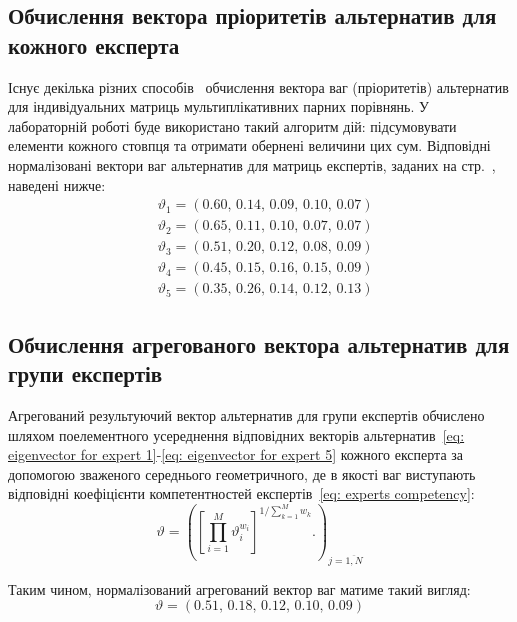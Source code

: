 \documentclass{mathreport}
\begin{document}
\subsection{Обчислення вектора пріоритетів альтернатив для кожного експерта}

Існує декілька різних способів~\cite{Saaty1990} обчислення вектора ваг (пріоритетів) альтернатив для індивідуальних матриць мультиплікативних парних порівнянь. У лабораторній роботі буде використано такий алгоритм дій: підсумовувати елементи кожного стовпця та отримати обернені величини цих сум. Відповідні нормалізовані вектори ваг альтернатив для матриць експертів, заданих на стр.~\pageref{table: 1-2 experts matrices}, наведені нижче:
\begin{align}
    & \vartheta_1 = (0.60,\, 0.14,\, 0.09,\, 0.10,\, 0.07) \label{eq: eigenvector for expert 1} \\
    & \vartheta_2 = (0.65,\, 0.11,\, 0.10,\, 0.07,\, 0.07) \label{eq: eigenvector for expert 2} \\
    & \vartheta_3 = (0.51,\, 0.20,\, 0.12,\, 0.08,\, 0.09) \label{eq: eigenvector for expert 3} \\
    & \vartheta_4 = (0.45,\, 0.15,\, 0.16,\, 0.15,\, 0.09) \label{eq: eigenvector for expert 4} \\
    & \vartheta_5 = (0.35,\, 0.26,\, 0.14,\, 0.12,\, 0.13) \label{eq: eigenvector for expert 5}
\end{align} 

\subsection{Обчислення агрегованого вектора альтернатив для групи експертів}
\label{section: merged eigenvector}

Агрегований результуючий вектор альтернатив для групи експертів обчислено шляхом поелементного усереднення відповідних векторів альтернатив~\eqref{eq: eigenvector for expert 1}-\eqref{eq: eigenvector for expert 5} кожного експерта за допомогою зваженого середнього геометричного, де в якості ваг виступають відповідні коефіцієнти компетентностей експертів~\eqref{eq: experts competency}:
\begin{equation}\label{eq: gmean}
    \vartheta = \left( \left[ \prod\limits_{i=1}^{M} \vartheta_{i}^{w_i} \right]^{1 \bigl/ \sum\limits_{k=1}^{M} w_k} \bigr. \right)_{j=\overline{1,N}}
\end{equation}

Таким чином, нормалізований агрегований вектор ваг матиме такий вигляд:
\begin{equation}\label{eq: gmean value}
    \vartheta = (0.51,\, 0.18,\, 0.12,\, 0.10,\, 0.09)
\end{equation}
\end{document}

